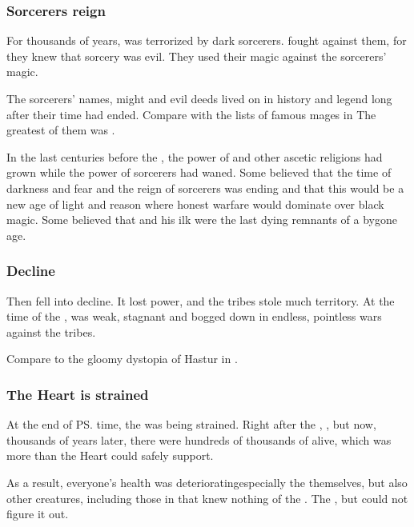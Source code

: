 \subsubsection{Sorcerers reign}
For thousands of years, \Nyx was terrorized by dark sorcerers. 
\Merkyrah fought against them, for they knew that sorcery was evil. 
They \Merkyrans used their  magic against the sorcerers'  magic. 

The sorcerers' names, might and evil deeds lived on in history and legend long after their time had ended. 
Compare with the lists of famous mages in \cite{JackVance:RhialtotheMarvelous}
The greatest of them was . 

In the last centuries before the , the power of \Merkyrah and other ascetic religions had grown while the power of sorcerers had waned. 
Some believed that the time of darkness and fear and the reign of sorcerers was ending and that this would be a new age of light and reason where honest warfare would dominate over black magic. 
Some believed that  and his ilk were the last dying remnants of a bygone age.





\subsubsection{Decline}
Then \Merkyrah fell into decline.
It lost power, and the tribes stole much territory. 
At the time of the , \Merkyrah was weak, stagnant and bogged down in endless, pointless wars against the tribes. 

Compare to the gloomy dystopia of Hastur in \cite{JamesBlish:MoreLight}. 





\subsubsection{The Heart is strained}
At the end of \ps{\Merkyrah} time, the  was being strained. 
Right after the \firstbanewar, , but now, thousands of years later, there were hundreds of thousands of \resphain{} alive, which was more than the Heart could safely support. 

As a result, everyone's health was deteriorating\dash especially the \resphain{} themselves, but also other creatures, including those in \Tembrae{} that knew nothing of the \resphain. 
The \dragons{} , but could not figure it out. 

